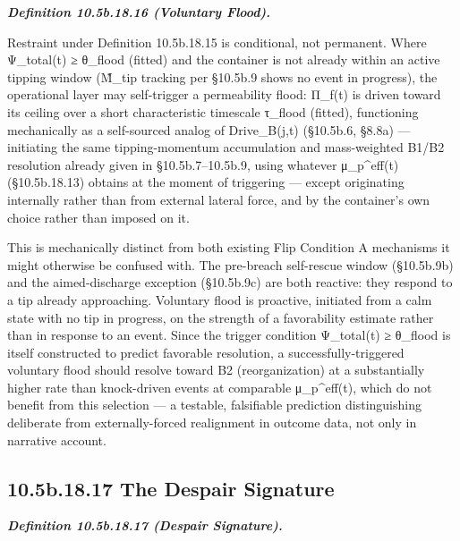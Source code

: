 \documentclass[
]{article}
\begin{document}
\emph{\textbf{Definition 10.5b.18.16 (Voluntary Flood).}}

Restraint under Definition 10.5b.18.15 is conditional, not permanent.
Where Ψ\_total(t) ≥ θ\_flood (fitted) and the container is not already
within an active tipping window (M̃\_tip tracking per §10.5b.9 shows no
event in progress), the operational layer may self-trigger a
permeability flood: Π\_f(t) is driven toward its ceiling over a short
characteristic timescale τ\_flood (fitted), functioning mechanically as
a self-sourced analog of Drive\_B(j,t) (§10.5b.6, §8.8a) --- initiating
the same tipping-momentum accumulation and mass-weighted B1/B2
resolution already given in §10.5b.7--10.5b.9, using whatever
μ\_p\^{}eff(t) (§10.5b.18.13) obtains at the moment of triggering ---
except originating internally rather than from external lateral force,
and by the container's own choice rather than imposed on it.

This is mechanically distinct from both existing Flip Condition A
mechanisms it might otherwise be confused with. The pre-breach
self-rescue window (§10.5b.9b) and the aimed-discharge exception
(§10.5b.9c) are both reactive: they respond to a tip already
approaching. Voluntary flood is proactive, initiated from a calm state
with no tip in progress, on the strength of a favorability estimate
rather than in response to an event. Since the trigger condition
Ψ\_total(t) ≥ θ\_flood is itself constructed to predict favorable
resolution, a successfully-triggered voluntary flood should resolve
toward B2 (reorganization) at a substantially higher rate than
knock-driven events at comparable μ\_p\^{}eff(t), which do not benefit
from this selection --- a testable, falsifiable prediction
distinguishing deliberate from externally-forced realignment in outcome
data, not only in narrative account.

\hypertarget{b.18.17-the-despair-signature}{%
\subsection{10.5b.18.17 The Despair
Signature}\label{b.18.17-the-despair-signature}}

\emph{\textbf{Definition 10.5b.18.17 (Despair Signature).}}
\end{document}
